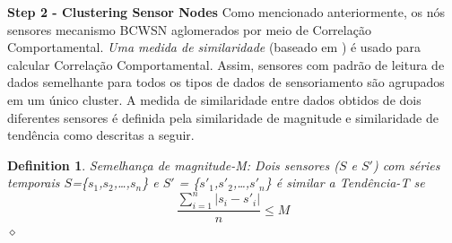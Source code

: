 \documentclass{acm_proc_article-sp}
\newcommand{\dia}{\hspace*{.1cm} \hfill $\diamond$}
\begin{document}
{\bf Step 2 - Clustering Sensor Nodes}
Como mencionado anteriormente, os nós sensores mecanismo BCWSN aglomerados
por meio de Correlação Comportamental. \textit{Uma medida de similaridade} 
(baseado em \cite{Liu2007}) é usado para calcular Correlação Comportamental. 
Assim, sensores com padrão de leitura de dados semelhante para todos os 
tipos de dados de sensoriamento são agrupados em um único cluster. 
A medida de similaridade entre dados obtidos de dois diferentes sensores 
é definida pela similaridade de magnitude e similaridade de tendência como
descritas a seguir.
\vspace*{-.3cm}

\newtheorem{defini}{Definition}

\begin{defini}
Semelhança de magnitude-M: Dois sensores ($S$ e $S'$) com séries temporais
$S$=\{$s_{1}$,$s_{2}$,\ldots,$s_{n}$\} e
$S'$ = \{$s'_{1}$,$s'_{2}$,\ldots,$s'_{n}$\} é similar a Tendência-T se 
\begin{equation}
\label{equ:magni}
\frac{\sum_{i=1}^{n} |s_{i}-s'_{i}|}{n} \leq M
\end{equation}
\dia
\end{defini}
\vspace*{-.9cm}
\end{document}
